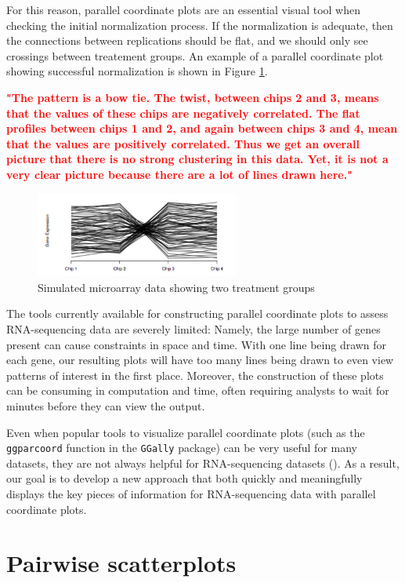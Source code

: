 \documentclass[11pt,a4paper,oldfontcommands,openany]{memoir}
\numberwithin{equation}{section} %
\newcommand{\code}[1]{{\texttt{#1}}}
\begin{document}
For this reason, parallel coordinate plots are an essential visual tool when checking the initial normalization process. If the normalization is adequate, then the connections between replications should be flat, and we should only see crossings between treatement groups. An example of a parallel coordinate plot showing successful normalization is shown in Figure \ref{fig:pcp}.

\textbf{\textcolor{Red}{"The pattern is a bow tie. The twist, between chips 2 and 3, means that the values of these chips are negatively correlated. The flat profiles between chips 1 and 2, and again between chips 3 and 4, mean that the values are positively correlated. Thus we get an overall picture that there is no strong clustering in this data. Yet, it is not a very clear picture because there are a lot of lines drawn here."}}

\begin{figure}[H]
    \centering
    \includegraphics[width=0.6\textwidth]{pcp}
    \caption{Simulated microarray data showing two treatment groups}
    \label{fig:pcp}
\end{figure}

The tools currently available for constructing parallel coordinate plots to assess RNA-sequencing data are severely limited: Namely, the large number of genes present can cause constraints in space and time. With one line being drawn for each gene, our resulting plots will have too many lines being drawn to even view patterns of interest in the first place. Moreover, the construction of these plots can be consuming in computation and time, often requiring analysts to wait for minutes before they can view the output.

Even when popular tools to visualize parallel coordinate plots (such as the \code{ggparcoord} function in the \code{GGally} package) can be very useful for many datasets, they are not always helpful for RNA-sequencing datasets (\citealt{ggally}). As a result, our goal is to develop a new approach that both quickly and meaningfully displays the key pieces of information for RNA-sequencing data with parallel coordinate plots. 

\section{Pairwise scatterplots}
\end{document}
